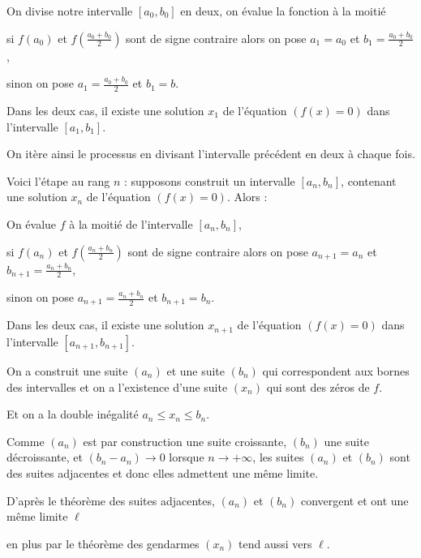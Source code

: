 \change

On divise notre intervalle $[a_0,b_0]$ en deux, on évalue la fonction à la moitié  

si $f(a_0)$ et $f(\frac{a_0+b_0}{2})$ sont de signe contraire alors on pose
$a_1=a_0$ et $b_1=\frac{a_0+b_0}{2}$, 

 sinon on pose $a_1=\frac{a_0+b_0}{2}$ et $b_1=b$.
 
 Dans les deux cas, il existe une solution $x_1$ de l'équation $(f(x)=0)$ 
 dans l'intervalle $[a_1,b_1]$. 
 
 \change
 
 On itère ainsi le processus en divisant l'intervalle précédent en deux à chaque fois.
 
 
 \change
 
 Voici l'étape au rang $n$ : supposons construit un intervalle $[a_n,b_n]$, 
 contenant une solution $x_n$ de l'équation $(f(x)=0)$. Alors :

 On évalue $f$ à la moitié de l'intervalle $[a_n,b_n]$,
 
si $f(a_n)$ et $f(\frac{a_n+b_n}{2})$ sont de signe contraire alors
on   pose $a_{n+1}=a_n$ et $b_{n+1}=\frac{a_n+b_n}{2}$, 

sinon on pose $a_{n+1}=\frac{a_n+b_n}{2}$ et $b_{n+1}=b_n$.  

Dans les deux cas, il existe une solution $x_{n+1}$ de l'équation $(f(x)=0)$ dans l'intervalle $[a_{n+1},b_{n+1}]$. 



\diapo

On a construit une suite $(a_n)$ et une suite $(b_n)$ qui correspondent 
aux bornes des intervalles et on a l'existence d'une suite $(x_n)$ qui sont des zéros de $f$.

Et on a la double inégalité $a_n \le x_n \le b_n.$


\change


Comme $(a_n)$ est par construction une suite croissante, $(b_n)$ une suite décroissante, 
et $(b_n-a_n) \to 0$ lorsque $n\to +\infty$, les suites $(a_n)$ et $(b_n)$ sont des suites 
adjacentes et donc elles admettent une même limite. 

D'après le théorème des suites adjacentes, $(a_n)$ et $(b_n)$ convergent et ont une même limite $\ell$

\change

en plus par le théorème des gendarmes $(x_n)$ tend aussi vers $\ell$.

